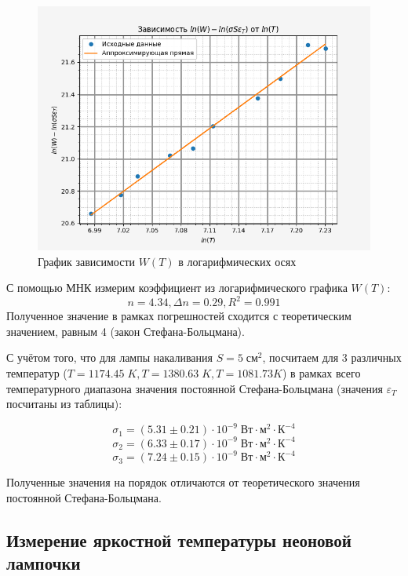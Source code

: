     \begin{figure}[h!]
        \centering
        \includegraphics[width = 13 cm]{images/WT_ln}
        \caption{График зависимости $W(T)$ в логарифмических осях}
        \label{}
    \end{figure}
    
    С помощью МНК измерим коэффициент из логарифмического графика $W(T)$:
    \begin{equation*}
        n = 4.34, \Delta n = 0.29, R^2 = 0.991
    \end{equation*}
    Полученное значение в рамках погрешностей сходится с теоретическим значением, равным 4 (закон Стефана-Больцмана).

    С учётом того, что для лампы накаливания $S = 5 \; \text{см}^2$, посчитаем для 3 различных температур ($T = 1174.45 \; K, T = 1380.63 \; K, T = 1081.73 K$) в рамках всего температурного диапазона значения постоянной Стефана-Больцмана (значения $\varepsilon_T$ посчитаны из таблицы):

    $$ \sigma_1 = (5.31 \pm 0.21) \cdot 10^{-9} \; \text{Вт} \cdot \text{м}^2 \cdot \text{К}^{-4} $$
    $$ \sigma_2 = (6.33 \pm 0.17) \cdot 10^{-9} \; \text{Вт} \cdot \text{м}^2 \cdot \text{К}^{-4} $$
    $$ \sigma_3 = (7.24 \pm 0.15) \cdot 10^{-9} \; \text{Вт} \cdot \text{м}^2 \cdot \text{К}^{-4} $$
    
    Полученные значения на порядок отличаются от теоретического значения постоянной Стефана-Больцмана.

\subsection{Измерение яркостной температуры неоновой лампочки}

